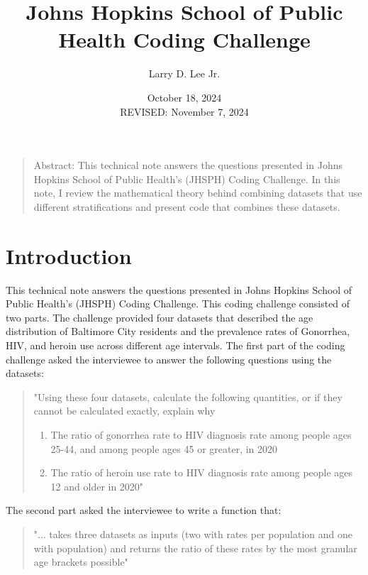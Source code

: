 \documentclass[]{article}
\title{Johns Hopkins School of Public Health Coding Challenge}
\author{Larry D. Lee Jr.}
\date{October 18, 2024\\REVISED: November 7, 2024}
\begin{document}
\maketitle

\begin{quote}
Abstract: This technical note answers the questions presented in Johns
Hopkins School of Public Health's (JHSPH) Coding Challenge. In this
note, I review the mathematical theory behind combining datasets that
use different stratifications and present code that combines these
datasets.
\end{quote}

\hypertarget{introduction}{%
\section{Introduction}\label{introduction}}

This technical note answers the questions presented in Johns Hopkins
School of Public Health's (JHSPH) Coding Challenge. This coding
challenge consisted of two parts. The challenge provided four datasets
that described the age distribution of Baltimore City residents and the
prevalence rates of Gonorrhea, HIV, and heroin use across different age
intervals. The first part of the coding challenge asked the interviewee
to answer the following questions using the datasets:

\begin{quote}
"Using these four datasets, calculate the following quantities, or if
they cannot be calculated exactly, explain why

\begin{enumerate}
\def\labelenumi{\arabic{enumi}.}
\item
  The ratio of gonorrhea rate to HIV diagnosis rate among people ages
  25-44, and among people ages 45 or greater, in 2020
\item
  The ratio of heroin use rate to HIV diagnosis rate among people ages
  12 and older in 2020"
\end{enumerate}
\end{quote}

The second part asked the interviewee to write a function that:

\begin{quote}
"... takes three datasets as inputs (two with rates per population and
one with population) and returns the ratio of these rates by the most
granular age brackets possible"
\end{quote}
\end{document}
